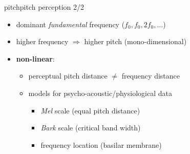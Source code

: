         \begin{frame}{pitch}{pitch perception 2/2}
            \begin{itemize}
                \item	dominant \textit{fundamental} frequency ($f_0,f_0,2f_0,\ldots$)
                    \vspace{-3mm}

                
                \item<2->	higher frequency $\Rightarrow$ higher pitch (mono-dimensional)

                \item<3->	\textbf{non-linear}:
                    \begin{itemize}
                        \item	perceptual pitch distance $\neq$ frequency distance
                        
                        \item<4->	models for psycho-acoustic/physiological data
                            \begin{itemize}
                                \item	\textit{Mel} scale (equal pitch distance)

                                \item<5->	\textit{Bark} scale (critical band width)

                                \item<6->	frequency location (basilar membrane)
                            \end{itemize}
                    \end{itemize}
            \end{itemize}
        \end{frame}
